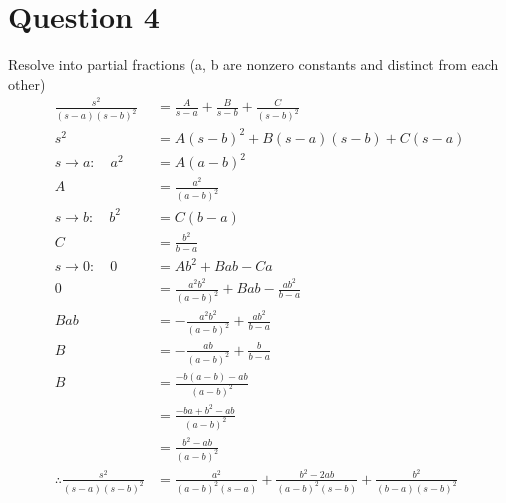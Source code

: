 \documentclass{article}
\begin{document}
\section*{Question 4}
Resolve into partial fractions (a, b are nonzero constants and distinct from each other)
\begin{align*}
    \frac{s^2}{(s-a)(s-b)^2}            & = \frac{A}{s-a}+\frac{B}{s-b}+\frac{C}{(s-b)^2}                                  \\
    s^2                                 & = A(s-b)^2+B(s-a)(s-b)+C(s-a)                                                    \\
    s\to a:\quad a^2                    & = A(a-b)^2                                                                       \\
    A                                   & = \frac{a^2}{(a-b)^2}                                                            \\
    s\to b:\quad b^2                    & = C(b-a)                                                                         \\
    C                                   & = \frac{b^2}{b-a}                                                                \\
    s\to 0:\quad 0                      & = Ab^2+Bab-Ca                                                                    \\
    0                                   & = \frac{a^2b^2}{(a-b)^2}+Bab-\frac{ab^2}{b-a}                                    \\
    Bab                                 & = -\frac{a^2b^2}{(a-b)^2}+\frac{ab^2}{b-a}                                       \\
    B                                   & = -\frac{ab}{(a-b)^2}+\frac{b}{b-a}                                              \\
    B                                   & = \frac{-b(a-b)-ab}{(a-b)^2}                                                     \\
                                        & = \frac{-ba+b^2-ab}{(a-b)^2}                                                     \\
                                        & = \frac{b^2-ab}{(a-b)^2}                                                         \\
    \therefore \frac{s^2}{(s-a)(s-b)^2} & = \frac{a^2}{(a-b)^2(s-a)}+\frac{b^2-2ab}{(a-b)^2(s-b)}+\frac{b^2}{(b-a)(s-b)^2}
\end{align*}
\end{document}
